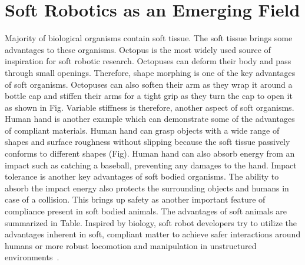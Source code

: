 \section{Soft Robotics as an Emerging Field}
\label{sec:emerging}
Majority of biological organisms contain soft tissue. The soft tissue brings some advantages to these organisms. Octopus is the most widely used source of inspiration for soft robotic research. Octopuses can deform their body and pass through small openings. Therefore, shape morphing is one of the key advantages of soft organisms. Octopuses can also soften their arm as they wrap it around a bottle cap and stiffen their arms for a tight grip as they turn the cap to open it as shown in Fig. Variable stiffness is therefore, another aspect of soft organisms. Human hand is another example which can demonstrate some of the advantages of compliant materials. Human hand can grasp objects with a wide range of shapes and surface roughness without slipping because the soft tissue passively conforms to different shapes (Fig). Human hand can also absorb energy from an impact such as catching a baseball, preventing any damages to the hand. Impact tolerance is another key advantages of soft bodied organisms. The ability to absorb the impact energy also protects the surrounding objects and humans in case of a collision. This brings up safety as another important feature of compliance present in soft bodied animals. The advantages of soft animals are summarized in Table. Inspired by biology, soft robot developers try to utilize the advantages inherent in soft, compliant matter to achieve safer interactions around humans or more robust locomotion and manipulation in unstructured environments~\cite{martinez2013,laschi2012,Tolley2014d,AdamBilodeau2015}.


